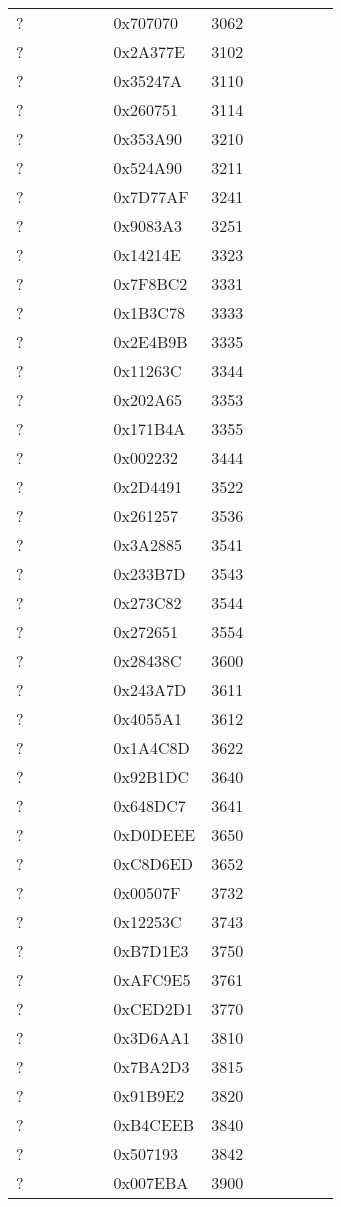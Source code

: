 \begin{longtable}{p{0.3\linewidth} p{0.3\linewidth} p{0.4\linewidth}}
? &  0x707070 &  3062\\
? &  0x2A377E &  3102\\
? &  0x35247A &  3110\\
? &  0x260751 &  3114\\
? &  0x353A90 &  3210\\
? &  0x524A90 &  3211\\
? &  0x7D77AF &  3241\\
? &  0x9083A3 &  3251\\
? &  0x14214E &  3323\\
? &  0x7F8BC2 &  3331\\
? &  0x1B3C78 &  3333\\
? &  0x2E4B9B &  3335\\
? &  0x11263C &  3344\\
? &  0x202A65 &  3353\\
? &  0x171B4A &  3355\\
? &  0x002232 &  3444\\
? &  0x2D4491 &  3522\\
? &  0x261257 &  3536\\
? &  0x3A2885 &  3541\\
? &  0x233B7D &  3543\\
? &  0x273C82 &  3544\\
? &  0x272651 &  3554\\
? &  0x28438C &  3600\\
? &  0x243A7D &  3611\\
? &  0x4055A1 &  3612\\
? &  0x1A4C8D &  3622\\
? &  0x92B1DC &  3640\\
? &  0x648DC7 &  3641\\
? &  0xD0DEEE &  3650\\
? &  0xC8D6ED &  3652\\
? &  0x00507F &  3732\\
? &  0x12253C &  3743\\
? &  0xB7D1E3 &  3750\\
? &  0xAFC9E5 &  3761\\
? &  0xCED2D1 &  3770\\
? &  0x3D6AA1 &  3810\\
? &  0x7BA2D3 &  3815\\
? &  0x91B9E2 &  3820\\
? &  0xB4CEEB &  3840\\
? &  0x507193 &  3842\\
? &  0x007EBA &  3900\\

\end{longtable}
